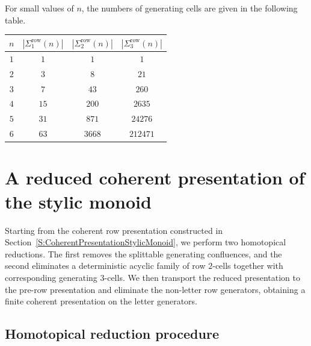 \documentclass[a4paper, twoside, 11pt, english]{article}
\begin{document}
\begin{example}
For small values of $n$, the numbers of generating cells are given in the following table.
\begin{center}
\begin{tabular}{|c|c|c|c|}
\hline
$n$ & $|\Sigma^{\mathrm{row}}_1(n)|$ & $|\Sigma^{\mathrm{row}}_2(n)|$ & $|\Sigma^{\mathrm{row}}_3(n)|$ \\
\hline
$1$ & $1$   & $1$    & $1$ \\
$2$ & $3$   & $8$    & $21$ \\
$3$ & $7$   & $43$   & $260$ \\
$4$ & $15$  & $200$  & $2635$ \\
$5$ & $31$  & $871$  & $24276$ \\
$6$ & $63$  & $3668$ & $212471$ \\
\hline
\end{tabular}
\end{center}
\end{example}



\section{A reduced coherent presentation of the stylic monoid}
\label{S:ReducedCoherentPresentationStylicMonoid}

Starting from the coherent row presentation constructed in
Section~\ref{S:CoherentPresentationStylicMonoid}, we perform two
homotopical reductions. The first removes the splittable generating
confluences, and the second eliminates a deterministic acyclic family of
row $2$-cells together with corresponding generating $3$-cells. We then
transport the reduced presentation to the pre-row presentation and eliminate
the non-letter row generators, obtaining a finite coherent presentation on
the letter generators.


\subsection{Homotopical reduction procedure}
\label{SS:HomotopicalReductionProcedure}
\end{document}
